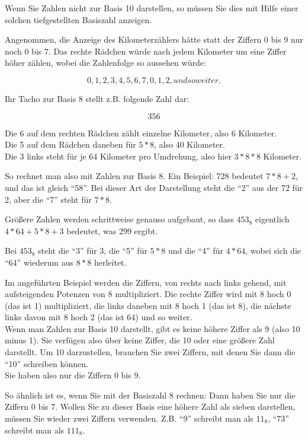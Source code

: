 \documentclass[a4paper,11pt, oneside,openright,titlepage,dvips]{scrbook}
\begin{document}
Wenn Sie Zahlen nicht zur Basis 10 darstellen, so müssen Sie dies mit Hilfe
einer solchen tiefgestellten Basiszahl anzeigen.


Angenommen, die Anzeige des Kilometerzählers hätte statt der Ziffern 0
bis 9 nur noch 0 bis 7. Das rechte Rädchen würde nach jedem Kilometer
um eine Ziffer höher zählen, wobei die Zahlenfolge so aussehen würde:

\[ 0, 1, 2, 3, 4, 5, 6, 7, 0, 1, 2, und so weiter. \]

Ihr Tacho zur Basis 8 stellt z.B. folgende Zahl dar:

\[ 356 \]

Die 6 auf dem rechten Rädchen zählt einzelne Kilometer, also 6
Kilometer.\\
Die 5 auf dem Rädchen daneben für $5 * 8$, also 40 Kilometer.\\
Die 3 links steht für je 64 Kilometer pro Umdrehung, also hier
$3 * 8 * 8$ Kilometer.

So rechnet man also mit Zahlen zur Basis 8. Ein Beispiel: 728 bedeutet
$7 * 8 + 2$, und das ist gleich "`58"'. Bei dieser Art der Darstellung
steht die "`2"' aus der 72 für 2, aber die "`7"' steht für $7 * 8$.

Größere Zahlen werden schrittweise genauso aufgebaut, so dass
$453_8$ eigentlich $4 * 64 + 5 * 8 + 3$ bedeutet, was 299 ergibt.

Bei $453_8$ steht die "`3"' für 3, die "`5"' für $5 * 8$ und die "`4"'
für $4 * 64$, wobei sich die "`64"' wiederum aus $8 * 8$ herleitet.

Im angeführten Beispiel werden die Ziffern, von rechts nach links
gehend, mit aufsteigenden Potenzen von 8 multipliziert. Die rechte
Ziffer wird mit 8 hoch 0 (das ist 1) multipliziert, die links daneben
mit 8 hoch 1 (das ist 8), die nächste links davon mit
8 hoch 2 (das ist 64) und so weiter.\\
Wenn man Zahlen zur Basis 10 darstellt, gibt es keine höhere Ziffer
als 9 (also 10 minus 1). Sie verfügen also über keine Ziffer, die 10
oder eine größere Zahl darstellt. Um 10 darzustellen, brauchen Sie
zwei Ziffern, mit denen Sie dann die "`10"' schreiben können.\\
Sie haben also nur die Ziffern 0 bis 9.

So ähnlich ist es, wenn Sie mit
der Basiszahl 8 rechnen: Dann haben Sie nur die Ziffern 0 bis 7.
Wollen Sie zu dieser Basis eine höhere Zahl als sieben darstellen,
müssen Sie wieder zwei Ziffern verwenden. Z.B. "`9"' schreibt
man als $11_8$, "`73"' schreibt man als $111_8$.
\end{document}
